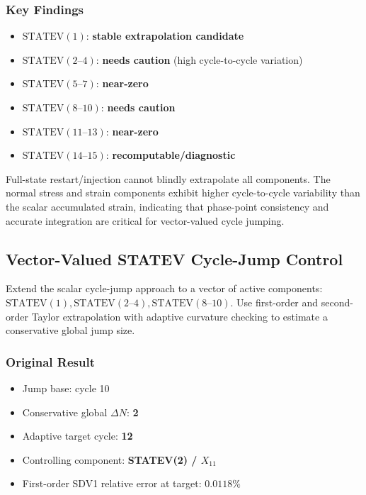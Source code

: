 \subsubsection{Key Findings}
\begin{itemize}
  \item $\text{STATEV}(1)$: \textbf{stable extrapolation candidate}
  \item $\text{STATEV}(2\text{--}4)$: \textbf{needs caution} (high cycle-to-cycle variation)
  \item $\text{STATEV}(5\text{--}7)$: \textbf{near-zero}
  \item $\text{STATEV}(8\text{--}10)$: \textbf{needs caution}
  \item $\text{STATEV}(11\text{--}13)$: \textbf{near-zero}
  \item $\text{STATEV}(14\text{--}15)$: \textbf{recomputable/diagnostic}
\end{itemize}

Full-state restart/injection cannot blindly extrapolate all components. The normal stress and strain components exhibit higher cycle-to-cycle variability than the scalar accumulated strain, indicating that phase-point consistency and accurate integration are critical for vector-valued cycle jumping.

\subsection{Vector-Valued STATEV Cycle-Jump Control}

Extend the scalar cycle-jump approach to a vector of active components: $\text{STATEV}(1), \text{STATEV}(2\text{--}4), \text{STATEV}(8\text{--}10)$. Use first-order and second-order Taylor extrapolation with adaptive curvature checking to estimate a conservative global jump size.

\subsubsection{Original Result}
\begin{itemize}
  \item Jump base: cycle 10
  \item Conservative global $\Delta N$: \textbf{2}
  \item Adaptive target cycle: \textbf{12}
  \item Controlling component: \textbf{STATEV(2) / $X_{11}$}
  \item First-order SDV1 relative error at target: $0.0118\%$
\end{itemize}

